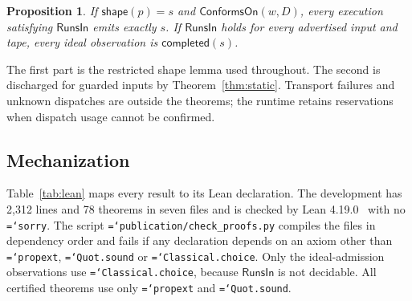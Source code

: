 \documentclass[preprint,12pt]{elsarticle}
\newtheorem{proposition}{Proposition}
\theoremstyle{definition}
\newcommand{\code}[1]{\texttt{\hyphenchar\font=`\-#1}}
\begin{document}
\begin{proposition}
If $\mathsf{shape}(p)=s$ and $\mathsf{ConformsOn}(w,D)$, every execution satisfying
$\mathsf{RunsIn}$ emits exactly $s$. If $\mathsf{RunsIn}$ holds for every advertised
input and tape, every ideal observation is $\mathsf{completed}(s)$.
\end{proposition}

The first part is the restricted shape lemma used throughout. The second is
discharged for guarded inputs by Theorem~\ref{thm:static}. Transport failures and
unknown dispatches are outside the theorems; the runtime retains reservations
when dispatch usage cannot be confirmed.

\subsection{Mechanization}\label{sec:mech}

Table~\ref{tab:lean} maps every result to its Lean declaration. The development
has 2,312 lines and 78 theorems in seven files and is checked by Lean
4.19.0~\cite{moura2021lean4} with no \code{sorry}. The script
\code{publication/check\_proofs.py} compiles the files in dependency order and fails
if any declaration depends on an axiom other than \code{propext},
\code{Quot.sound} or \code{Classical.choice}. Only the ideal-admission
observations use \code{Classical.choice}, because $\mathsf{RunsIn}$ is not
decidable. All certified theorems use only \code{propext} and \code{Quot.sound}.
\end{document}
